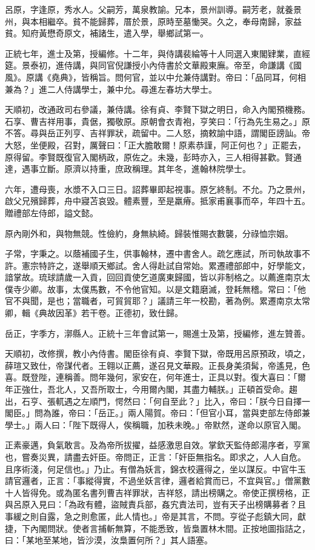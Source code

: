 \begin{pinyinscope}
呂原，字逢原，秀水人。父嗣芳，萬泉教諭。兄本，景州訓導。嗣芳老，就養景州，與本相繼卒。貧不能歸葬，厝於景，原時至墓慟哭。久之，奉母南歸，家益貧。知府黃懋奇原文，補諸生，遣入學，舉鄉試第一。

正統七年，進士及第，授編修。十二年，與侍講裴綸等十人同選入東閣肄業，直經筵。景泰初，進侍講，與同官倪謙授小內侍書於文華殿東廡。帝至，命謙講《國風》。原講《堯典》，皆稱旨。問何官，並以中允兼侍講對。帝曰：「品同耳，何相兼為？」進二人侍講學士，兼中允。尋進左春坊大學士。

天順初，改通政司右參議，兼侍講。徐有貞、李賢下獄之明日，命入內閣預機務。石享、曹吉祥用事，貴倨，獨敬原。原朝會衣青袍，亨笑曰：「行為先生易之。」原不答。尋與岳正列亨、吉祥罪狀，疏留中。二人怒，摘敕諭中語，謂閣臣謗訕。帝大怒，坐便殿，召對，厲聲曰：「正大膽敢爾！原素恭謹，阿正何也？」正罷去，原得留。李賢既復官入閣柄政，原佐之。未幾，彭時亦入，三人相得甚歡。賢通達，遇事立斷。原濟以持重，庶政稱理。其年冬，進翰林院學士。

六年，遭母喪，水漿不入口三日。詔葬畢即起視事。原乞終制。不允。乃之景州，啟父兄殯歸葬，舟中寢苫哀毀。體素豐，至是羸瘠。抵家甫襄事而卒，年四十五。贈禮部左侍郎，謚文懿。

原內剛外和，與物無競。性儉約，身無紈綺。歸裝惟賜衣數襲，分祿恤宗姻。

子常，字秉之。以蔭補國子生，供事翰林，遷中書舍人。疏乞應試，所司執故事不許。憲宗特許之，遂舉順天鄉試。舍人得赴試自常始。累遷禮部郎中，好學能文，諳掌故。琉球請歲一入貢，回回貢使乞道廣東歸國，皆以非制格之。以薦進南京太僕寺少卿。故事，太僕馬數，不令他官知。以是文籍磨滅，登耗無稽。常曰：「他官不與聞，是也；當職者，可貿貿耶？」議請三年一校勘，著為例。累遷南京太常卿，輯《典故因革》若干卷。正德初，致仕歸。

岳正，字季方，漷縣人。正統十三年會試第一，賜進士及第，授編修，進左贊善。

天順初，改修撰，教小內侍書。閣臣徐有貞、李賢下獄，帝既用呂原預政，頃之，薛瑄又致仕，帝謀代者。王翱以正薦，遂召見文華殿。正長身美須髯，帝遙見，色喜。既登陛，連稱善。問年幾何，家安在，何年進士，正具以對。復大喜曰：「爾年正強仕，吾北人，又吾所取士，今用爾內閣，其盡力輔朕。」正頓首受命。趨出，石亨、張軏遇之左順門，愕然曰：「何自至此？」比入，帝曰：「朕今日自擇一閣臣。」問為誰，帝曰：「岳正。」兩人陽賀。帝曰：「但官小耳，當與吏部左侍郎兼學士。」兩人曰：「陛下既得人，俟稱職，加秩未晚。」帝默然，遂命以原官入閣。

正素豪邁，負氣敢言。及為帝所拔擢，益感激思自效。掌欽天監侍郎湯序者，亨黨也，嘗奏災異，請盡去奸臣。帝問正，正言：「奸臣無指名。即求之，人人自危。且序術淺，何足信也。」乃止。有僧為妖言，錦衣校邏得之，坐以謀反。中官牛玉請官邏者，正言：「事縱得實，不過坐妖言律，邏者給賞而已，不宜與官。」僧黨數十人皆得免。或為匿名書列曹吉祥罪狀，吉祥怒，請出榜購之。帝使正撰榜格，正與呂原入見曰：「為政有體，盜賊責兵部，姦宄責法司，豈有天子出榜購募者？且事緩之則自露，急之則愈匿，此人情也。」帝是其言，不問。亨從子彪鎮大同，獻捷，下內閣問狀。使者言捕斬無算，不能悉致，皆梟置林木間。正按地圖指詰之，曰：「某地至某地，皆沙漠，汝梟置何所？」其人語塞。


\end{pinyinscope}
